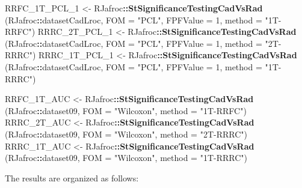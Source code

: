 \documentclass[
]{book}
\newenvironment{Shaded}{\begin{snugshade}}{\end{snugshade}}
\newcommand{\DataTypeTok}[1]{\textcolor[rgb]{0.13,0.29,0.53}{#1}}
\newcommand{\DecValTok}[1]{\textcolor[rgb]{0.00,0.00,0.81}{#1}}
\newcommand{\KeywordTok}[1]{\textcolor[rgb]{0.13,0.29,0.53}{\textbf{#1}}}
\newcommand{\NormalTok}[1]{#1}
\newcommand{\OperatorTok}[1]{\textcolor[rgb]{0.81,0.36,0.00}{\textbf{#1}}}
\newcommand{\StringTok}[1]{\textcolor[rgb]{0.31,0.60,0.02}{#1}}
\begin{document}
\begin{Shaded}
\begin{Highlighting}[]
\NormalTok{RRFC_1T_PCL_}\DecValTok{1}\NormalTok{ <-}\StringTok{ }\NormalTok{RJafroc}\OperatorTok{::}\KeywordTok{StSignificanceTestingCadVsRad}\NormalTok{ (RJafroc}\OperatorTok{::}\NormalTok{datasetCadLroc, }
\DataTypeTok{FOM =} \StringTok{"PCL"}\NormalTok{, }\DataTypeTok{FPFValue =} \DecValTok{1}\NormalTok{, }\DataTypeTok{method =} \StringTok{"1T-RRFC"}\NormalTok{)}
\NormalTok{RRRC_2T_PCL_}\DecValTok{1}\NormalTok{ <-}\StringTok{ }\NormalTok{RJafroc}\OperatorTok{::}\KeywordTok{StSignificanceTestingCadVsRad}\NormalTok{ (RJafroc}\OperatorTok{::}\NormalTok{datasetCadLroc, }
\DataTypeTok{FOM =} \StringTok{"PCL"}\NormalTok{, }\DataTypeTok{FPFValue =} \DecValTok{1}\NormalTok{, }\DataTypeTok{method =} \StringTok{"2T-RRRC"}\NormalTok{)}
\NormalTok{RRRC_1T_PCL_}\DecValTok{1}\NormalTok{ <-}\StringTok{ }\NormalTok{RJafroc}\OperatorTok{::}\KeywordTok{StSignificanceTestingCadVsRad}\NormalTok{ (RJafroc}\OperatorTok{::}\NormalTok{datasetCadLroc, }
\DataTypeTok{FOM =} \StringTok{"PCL"}\NormalTok{, }\DataTypeTok{FPFValue =} \DecValTok{1}\NormalTok{, }\DataTypeTok{method =} \StringTok{"1T-RRRC"}\NormalTok{)}

\NormalTok{RRFC_1T_AUC <-}\StringTok{ }\NormalTok{RJafroc}\OperatorTok{::}\KeywordTok{StSignificanceTestingCadVsRad}\NormalTok{ (RJafroc}\OperatorTok{::}\NormalTok{dataset09, }
\DataTypeTok{FOM =} \StringTok{"Wilcoxon"}\NormalTok{, }\DataTypeTok{method =} \StringTok{"1T-RRFC"}\NormalTok{)}
\NormalTok{RRRC_2T_AUC <-}\StringTok{ }\NormalTok{RJafroc}\OperatorTok{::}\KeywordTok{StSignificanceTestingCadVsRad}\NormalTok{ (RJafroc}\OperatorTok{::}\NormalTok{dataset09, }
\DataTypeTok{FOM =} \StringTok{"Wilcoxon"}\NormalTok{, }\DataTypeTok{method =} \StringTok{"2T-RRRC"}\NormalTok{)}
\NormalTok{RRRC_1T_AUC <-}\StringTok{ }\NormalTok{RJafroc}\OperatorTok{::}\KeywordTok{StSignificanceTestingCadVsRad}\NormalTok{ (RJafroc}\OperatorTok{::}\NormalTok{dataset09, }
\DataTypeTok{FOM =} \StringTok{"Wilcoxon"}\NormalTok{, }\DataTypeTok{method =} \StringTok{"1T-RRRC"}\NormalTok{)}
\end{Highlighting}
\end{Shaded}

The results are organized as follows:
\end{document}
